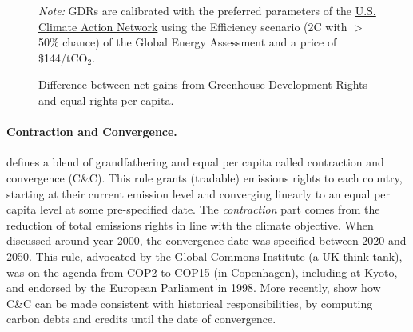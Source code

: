 \begin{figure}[h!]
    \caption[Comparison between GDR and equal per capita burden-sharing rules.]{Difference between net gains from Greenhouse Development Rights and equal rights per capita. }\label{fig:diff_gain_gdr_gcs_over_gdp_2030}
    {\small \textit{Note:} GDRs are calibrated with the preferred parameters of the \href{https://usfairshare.org/}{U.S. Climate Action Network} \citep{athanasiou_fair_2022} using the Efficiency scenario (2\textdegree{}C with $>$50\% chance) of the Global Energy Assessment \citep{johansson_global_2012} and a price of \$144/tCO$_\text{2}$.}
\end{figure}

\paragraph{Contraction and Convergence.} \citet{meyer_briefing_2004} defines a blend of grandfathering and equal per capita called contraction and convergence (C\&C). This rule grants (tradable) emissions rights to each country, starting at their current emission level and converging linearly to an equal per capita level at some pre-specified date. The \textit{contraction} part comes from the reduction of total emissions rights in line with the climate objective. When discussed around year 2000, the convergence date was specified between 2020 and 2050. This rule, advocated by the Global Commons Institute (a UK think tank), was on the agenda from COP2 to COP15 (in Copenhagen), including at Kyoto, and endorsed by the European Parliament in 1998. More recently, \citet{gignac_allocating_2015} show how C\&C can be made consistent with historical responsibilities, by computing carbon debts and credits until the date of convergence.

